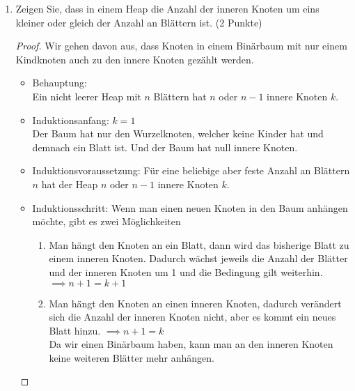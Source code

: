\documentclass[ngerman,landscape,twocolumn]{adtexsheet}
\begin{document}
\begin{question}
\begin{enumerate}
    \item Zeigen Sie, dass in einem Heap die Anzahl der inneren Knoten um eins kleiner oder gleich der Anzahl an Blättern ist. (2 Punkte)
    \begin{proof}
    Wir gehen davon aus, dass Knoten in einem Binärbaum mit nur einem Kindknoten auch zu den innere Knoten gezählt werden.
    
        \begin{itemize}
            \item Behauptung:\\ Ein nicht leerer Heap mit $n$ Blättern hat $n$ oder $n-1$ innere Knoten $k$.
            \item Induktionsanfang: $k=1$ \\
                Der Baum hat nur den Wurzelknoten, welcher keine Kinder hat und demnach ein Blatt ist. Und der Baum hat null innere Knoten. \checkmark
            \item Induktionsvoraussetzung: Für eine beliebige aber feste Anzahl an Blättern $n$ hat der Heap $n$ oder $n-1$ innere Knoten $k$.
            \item Induktionsschritt: Wenn man einen neuen Knoten in den Baum anhängen möchte, gibt es zwei Möglichkeiten
            \begin{enumerate}
                \item Man hängt den Knoten an ein Blatt, dann wird das bisherige Blatt zu einem inneren Knoten. Dadurch wächst jeweils die Anzahl der Blätter und der inneren Knoten um 1 und die Bedingung gilt weiterhin. $\implies n+1 = k+1$ \checkmark
                \item Man hängt den Knoten an einen inneren Knoten, dadurch verändert sich die Anzahl der inneren Knoten nicht, aber es kommt ein neues Blatt hinzu. $\implies n+1 = k$ \checkmark\\ Da wir einen Binärbaum haben, kann man an den inneren Knoten keine weiteren Blätter mehr anhängen.
            \end{enumerate}
        \end{itemize}
    \end{proof}
    \end{enumerate}
\end{question}

\end{document}
